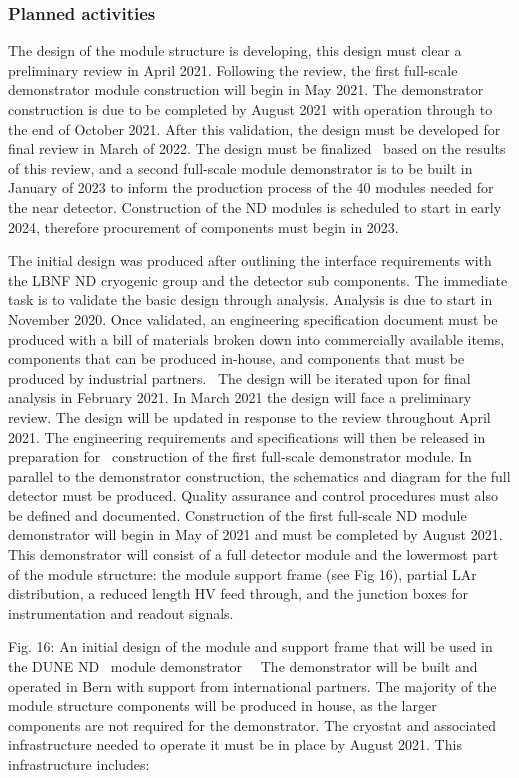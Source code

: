 \subsubsection{Planned activities}
The design of the module structure is developing, this design must clear a preliminary review in April 2021. Following the review, the first full-scale demonstrator module construction will begin in May 2021. The demonstrator construction is due to be completed by August 2021 with operation through to the end of October 2021. After this validation, the design must be developed for final review in March of 2022. The design must be finalized  based on the results of this review, and a second full-scale module demonstrator is to be built in January of 2023 to inform the production process of the 40 modules needed for the near detector. Construction of the ND modules is scheduled to start in early 2024, therefore procurement of components must begin in 2023.

The initial design was produced after outlining the interface requirements with the LBNF ND cryogenic group and the detector sub components. The immediate task is to validate the basic design through analysis. Analysis is due to start in November 2020. Once validated, an engineering specification document must be produced with a bill of materials broken down into commercially available items, components that can be produced in-house, and components that must be produced by industrial partners.  The design will be iterated upon for final analysis in February 2021. In March 2021 the design will face a preliminary review. The design will be updated in response to the review throughout April 2021. The engineering requirements and specifications will then be released in preparation for  construction of the first full-scale demonstrator module. In parallel to the demonstrator construction, the schematics and diagram for the full detector must be produced. Quality assurance and control procedures must also be defined and documented. 
Construction of the first full-scale ND module demonstrator will begin in May of 2021 and must be completed by August 2021. This demonstrator will consist of a full detector module and the lowermost part of the module structure: the module support frame (see Fig 16), partial LAr distribution, a reduced length HV feed through, and the junction boxes for instrumentation and readout signals.

Fig. 16: An initial design of the module and support frame that will be used in the DUNE ND  module demonstrator 
 The demonstrator will be built and operated in Bern with support from international partners. The majority of the module structure components will be produced in house, as the larger components are not required for the demonstrator. The cryostat and associated infrastructure needed to operate it must be in place by August 2021. This infrastructure includes:

